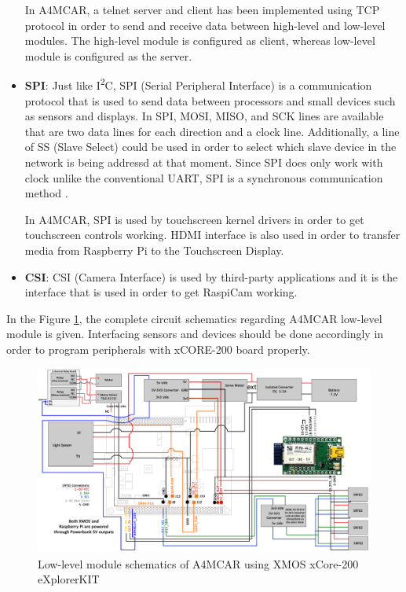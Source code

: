 \begin{itemize}
	In A4MCAR, a telnet server and client has been implemented using TCP protocol in order to send and receive data between high-level and low-level modules. The high-level module is configured as client, whereas low-level module is configured as the server. 
	\item \textbf{SPI}: Just like I\textsuperscript{2}C, SPI (Serial Peripheral Interface) is a communication protocol that is used to send data between processors and small devices such as sensors and displays. In SPI, MOSI, MISO, and SCK lines are available that are two data lines for each direction and a clock line. Additionally, a line of SS (Slave Select) could be used in order to select which slave device in the network is being addressd at that moment. Since SPI does only work with clock unlike the conventional UART, SPI is a synchronous communication method \cite{spi}.
	
	In A4MCAR, SPI is used by touchscreen kernel drivers in order to get touchscreen controls working. HDMI interface is also used in order to transfer media from Raspberry Pi to the Touchscreen Display.
	\item \textbf{CSI}: CSI (Camera Interface) is used by third-party applications and it is the interface that is used in order to get RaspiCam working.
\end{itemize}

In the Figure \ref{fig:RCCAR_Schematics}, the complete circuit schematics regarding A4MCAR low-level module is given. Interfacing sensors and devices should be done accordingly in order to program peripherals with xCORE-200 board properly. 
\begin{figure}[!ht]
	\centering
	\captionsetup{justification=centering}
	\includegraphics[width=\textwidth]{content/images/RCCAR_Schematics.png}
	\caption{Low-level module schematics of A4MCAR using XMOS xCore-200 eXplorerKIT}
	\label{fig:RCCAR_Schematics}
\end{figure}
